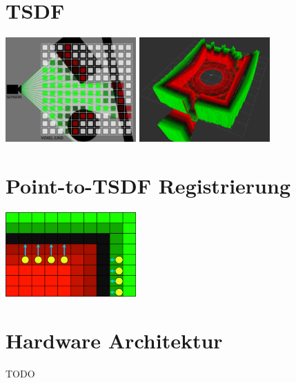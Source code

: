 \documentclass{beamer}
\begin{document}
\section{TSDF}
\begin{frame}{\secname}
\begin{center}
\includegraphics[width=5cm]{images/TSDF_Gen_new.png}
\includegraphics[width=5cm]{images/TSDF_3D.png}
\end{center}
\end{frame}

\section{Point-to-TSDF Registrierung}
\begin{frame}{\secname}
\begin{center}
\includegraphics[width=5cm]{images/Reg_Gradient.png}
\end{center}
\end{frame}

\section{Hardware Architektur}
\begin{frame}{\secname}
TODO
\end{frame}
\end{document}
